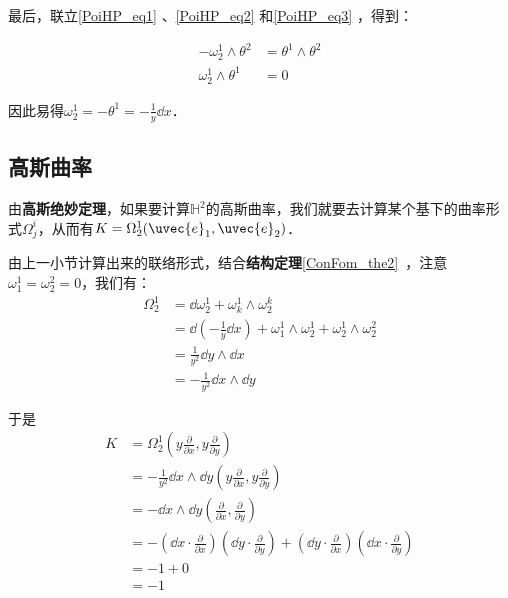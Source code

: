 最后，联立\autoref{PoiHP_eq1} 、\autoref{PoiHP_eq2} 和\autoref{PoiHP_eq3} ，得到：

\begin{equation}
\begin{aligned}
-\omega^1_2\wedge\theta^2&=\theta^1\wedge\theta^2\\
\omega^1_2\wedge\theta^1&=0
\end{aligned}
\end{equation}

因此易得$\omega^1_2=-\theta^1=-\frac{1}{y}\dd x$．



\subsection{高斯曲率}


由\textbf{高斯绝妙定理}，如果要计算$\mathbb{H}^2$的高斯曲率，我们就要去计算某个基下的曲率形式$\Omega^i_j$，从而有$K=\Omega^1_2(\uvec{e}_1, \uvec{e}_2)$．

由上一小节计算出来的联络形式，结合\textbf{结构定理}\autoref{ConFom_the2}~，注意$\omega^1_1=\omega^2_2=0$，我们有：
\begin{equation}
\begin{aligned}
\Omega^1_2&=\dd \omega^1_2+\omega^1_k\wedge\omega^k_2\\
&=\dd(-\frac{1}{y}\dd x)+\omega^1_1\wedge\omega^1_2+\omega^1_2\wedge\omega^2_2\\
&=\frac{1}{y^2}\dd y\wedge\dd x\\
&=-\frac{1}{y^2}\dd x\wedge \dd y
\end{aligned}
\end{equation}

于是
\begin{equation}
\begin{aligned}
K&=\Omega^1_2(y\frac{\partial}{\partial x}, y\frac{\partial}{\partial y})\\
&=-\frac{1}{y^2}\dd x\wedge \dd y(y\frac{\partial}{\partial x}, y\frac{\partial}{\partial y})\\
&=-\dd x\wedge \dd y(\frac{\partial}{\partial x}, \frac{\partial}{\partial y})\\
&=-(\dd x\cdot \frac{\partial}{\partial x})(\dd y\cdot \frac{\partial}{\partial y})+(\dd y\cdot \frac{\partial}{\partial x})(\dd x\cdot \frac{\partial}{\partial y})\\
&=-1+0\\
&=-1
\end{aligned}
\end{equation}

